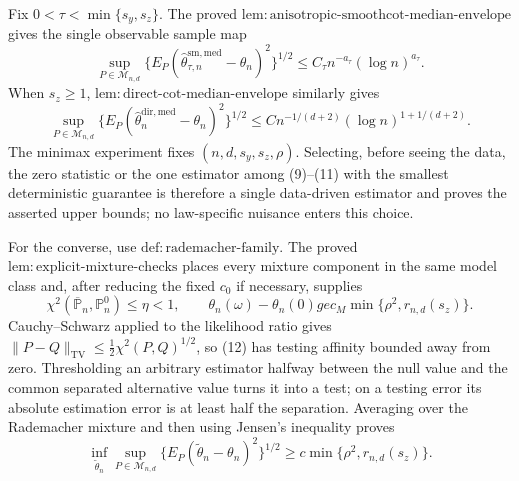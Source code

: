 Fix \(0<\tau<\min\{s_y,s_z\}\). The proved \(\mathrm{lem{:}anisotropic\text{-}smoothcot\text{-}median\text{-}envelope}\) gives the single observable sample map
\[
\sup_{P\in\mathcal M_{n,d}}
\{E_P(\widehat\theta^{\mathrm{sm,med}}_{\tau,n}-\theta_n)^2\}^{1/2}
\le C_\tau n^{-a_\tau}(\log n)^{a_\tau}.                         \tag{10}
\]
When \(s_z\ge1\), \(\mathrm{lem{:}direct\text{-}cot\text{-}median\text{-}envelope}\) similarly gives
\[
\sup_{P\in\mathcal M_{n,d}}
\{E_P(\widehat\theta_n^{\mathrm{dir,med}}-\theta_n)^2\}^{1/2}
\le C n^{-1/(d+2)}(\log n)^{1+1/(d+2)}.                            \tag{11}
\]
The minimax experiment fixes \((n,d,s_y,s_z,\rho)\). Selecting, before seeing the data, the zero statistic or the one estimator among (9)--(11) with the smallest deterministic guarantee is therefore a single data-driven estimator and proves the asserted upper bounds; no law-specific nuisance enters this choice.

For the converse, use \(\mathrm{def{:}rademacher\text{-}family}\). The proved \(\mathrm{lem{:}explicit\text{-}mixture\text{-}checks}\) places every mixture component in the same model class and, after reducing the fixed \(c_0\) if necessary, supplies
\[
\chi^2(\overline{\mathbb P}_n,\mathbb P_n^0)\le\eta<1,
\qquad
\theta_n(\omega)-\theta_n(0)ge c_M\min\{\rho^2,r_{n,d}(s_z)\}.  \tag{12}
\]
Cauchy--Schwarz applied to the likelihood ratio gives
\(\|P-Q\|_{\mathrm{TV}}\le\frac12\chi^2(P,Q)^{1/2}\), so (12) has testing affinity bounded away from zero. Thresholding an arbitrary estimator halfway between the null value and the common separated alternative value turns it into a test; on a testing error its absolute estimation error is at least half the separation. Averaging over the Rademacher mixture and then using Jensen's inequality proves
\[
\inf_{\widetilde\theta_n}\sup_{P\in\mathcal M_{n,d}}
\{E_P(\widetilde\theta_n-\theta_n)^2\}^{1/2}
\ge c\min\{\rho^2,r_{n,d}(s_z)\}.                                 \tag{13}
\]

